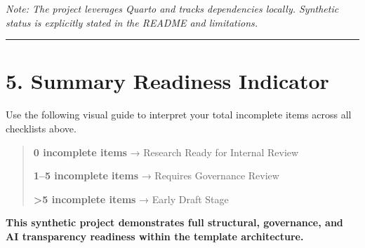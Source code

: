 \documentclass[
]{report}
\begin{document}
\emph{Note: The project leverages Quarto and tracks dependencies
locally. Synthetic status is explicitly stated in the README and
limitations.}

\begin{center}\rule{0.5\linewidth}{0.5pt}\end{center}

\chapter{5. Summary Readiness
Indicator}\label{summary-readiness-indicator}

Use the following visual guide to interpret your total incomplete items
across all checklists above.

\begin{quote}
\textbf{0 incomplete items} → Research Ready for Internal Review

\textbf{1--5 incomplete items} → Requires Governance Review

\textbf{\textgreater5 incomplete items} → Early Draft Stage
\end{quote}

\textbf{This synthetic project demonstrates full structural, governance,
and AI transparency readiness within the template architecture.}
\end{document}
